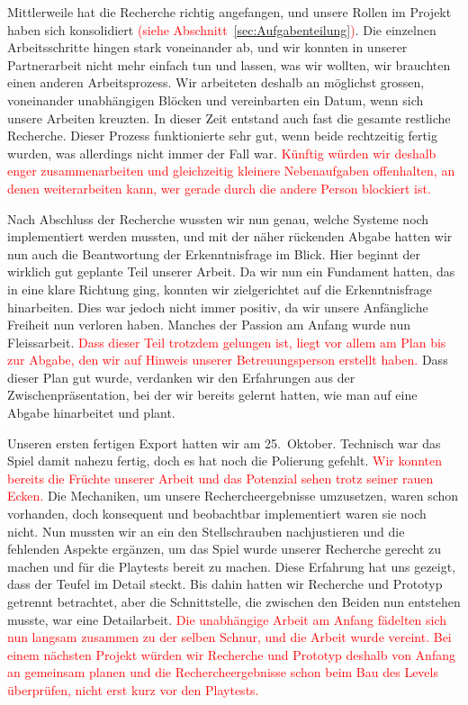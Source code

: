 \documentclass[../Main.tex]{subfiles}
\begin{document}
Mittlerweile hat die Recherche richtig angefangen, und unsere Rollen im Projekt haben sich konsolidiert\textcolor{red}{ (siehe Abschnitt~\ref{sec:Aufgabenteilung})}. Die einzelnen Arbeitsschritte hingen stark voneinander ab, und wir konnten in unserer Partnerarbeit nicht mehr einfach tun und lassen, was wir wollten, wir brauchten einen anderen Arbeitsprozess. Wir arbeiteten deshalb an möglichst grossen, voneinander unabhängigen Blöcken und vereinbarten ein Datum, wenn sich unsere Arbeiten kreuzten. In dieser Zeit entstand auch fast die gesamte restliche Recherche. Dieser Prozess funktionierte sehr gut, wenn beide rechtzeitig fertig wurden, was allerdings nicht immer der Fall war. \textcolor{red}{Künftig würden wir deshalb enger zusammenarbeiten und gleichzeitig kleinere Nebenaufgaben offenhalten, an denen weiterarbeiten kann, wer gerade durch die andere Person blockiert ist.}

Nach Abschluss der Recherche wussten wir nun genau, welche Systeme noch implementiert werden mussten, und mit der näher rückenden Abgabe hatten wir nun auch die Beantwortung der Erkenntnisfrage im Blick. Hier beginnt der wirklich gut geplante Teil unserer Arbeit. Da wir nun ein Fundament hatten, das in eine klare Richtung ging, konnten wir zielgerichtet auf die Erkenntnisfrage hinarbeiten. Dies war jedoch nicht immer positiv, da wir unsere Anfängliche Freiheit nun verloren haben. Manches der Passion am Anfang wurde nun Fleissarbeit. \textcolor{red}{Dass dieser Teil trotzdem gelungen ist, liegt vor allem am Plan bis zur Abgabe, den wir auf Hinweis unserer Betreuungsperson erstellt haben.} Dass dieser Plan gut wurde, verdanken wir den Erfahrungen aus der Zwischenpräsentation, bei der wir bereits gelernt hatten, wie man auf eine Abgabe hinarbeitet und plant.

Unseren ersten fertigen Export hatten wir am 25.~Oktober. Technisch war das Spiel damit nahezu fertig, doch es hat noch die Polierung gefehlt. \textcolor{red}{Wir konnten bereits die Früchte unserer Arbeit und das Potenzial sehen trotz seiner rauen Ecken.} Die Mechaniken, um unsere Rechercheergebnisse umzusetzen, waren schon vorhanden, doch konsequent und beobachtbar implementiert waren sie noch nicht. Nun mussten wir an ein den Stellschrauben nachjustieren und die fehlenden Aspekte ergänzen, um das Spiel wurde unserer Recherche gerecht zu machen und für die Playtests bereit zu machen. Diese Erfahrung hat uns gezeigt, dass der Teufel im Detail steckt. Bis dahin hatten wir Recherche und Prototyp getrennt betrachtet, aber die Schnittstelle, die zwischen den Beiden nun entstehen musste, war eine Detailarbeit. \textcolor{red}{Die unabhängige Arbeit am Anfang fädelten sich nun langsam zusammen zu der selben Schnur, und die Arbeit wurde vereint.} \textcolor{red}{Bei einem nächsten Projekt würden wir Recherche und Prototyp deshalb von Anfang an gemeinsam planen und die Rechercheergebnisse schon beim Bau des Levels überprüfen, nicht erst kurz vor den Playtests.}
\end{document}
